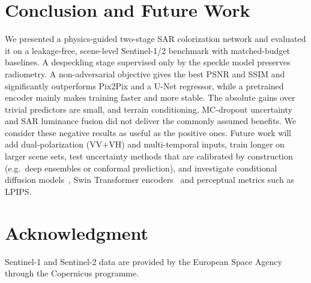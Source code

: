 \documentclass[conference]{IEEEtran}
\begin{document}
\section{Conclusion and Future Work}
We presented a physics-guided two-stage SAR colorization network and evaluated it on a leakage-free, scene-level Sentinel-1/2
benchmark with matched-budget baselines. A despeckling stage supervised only by the speckle model preserves radiometry. A
non-adversarial objective gives the best PSNR and SSIM and significantly outperforms Pix2Pix and a U-Net regressor, while a
pretrained encoder mainly makes training faster and more stable. The absolute gains over trivial predictors are small, and terrain conditioning, MC-dropout uncertainty and SAR
luminance fusion did not deliver the commonly assumed benefits. We consider these negative results as useful as the positive
ones. Future work will add dual-polarization (VV+VH) and multi-temporal inputs, train longer on larger scene sets, test
uncertainty methods that are calibrated by construction (e.g.\ deep ensembles or conformal prediction), and investigate
conditional diffusion models~\cite{rombach2022ldm}, Swin Transformer encoders~\cite{liu2021swin} and perceptual metrics such as
LPIPS.

\section*{Acknowledgment}
Sentinel-1 and Sentinel-2 data are provided by the European Space Agency through the Copernicus programme.



\end{document}
